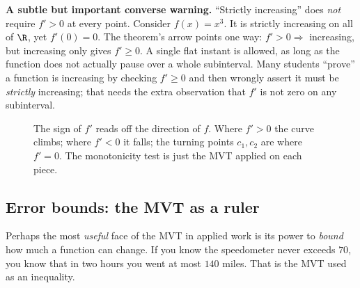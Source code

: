\begin{trapbox}
\textbf{A subtle but important converse warning.} ``Strictly increasing'' does
\emph{not} require $f'>0$ at every point. Consider $f(x)=x^3$. It is strictly
increasing on all of $\R$, yet $f'(0)=0$. The theorem's arrow points one way:
$f'>0\Rightarrow$ increasing, but increasing only gives $f'\ge 0$. A single flat
instant is allowed, as long as the function does not actually pause over a whole
subinterval. Many students ``prove'' a function is increasing by checking $f'\ge 0$
and then wrongly assert it must be \emph{strictly} increasing; that needs the extra
observation that $f'$ is not zero on any subinterval.
\end{trapbox}

\begin{figure}[H]
\centering
{}
\caption{The sign of $f'$ reads off the direction of $f$. Where $f'>0$ the curve
climbs; where $f'<0$ it falls; the turning points $c_1,c_2$ are where $f'=0$. The
monotonicity test is just the MVT applied on each piece.}
\label{ch15:fig-mono}
\end{figure}

\subsection{Error bounds: the MVT as a ruler}

Perhaps the most \emph{useful} face of the MVT in applied work is its power to
\emph{bound} how much a function can change. If you know the speedometer never
exceeds $70$, you know that in two hours you went at most $140$ miles. That is the
MVT used as an inequality.

